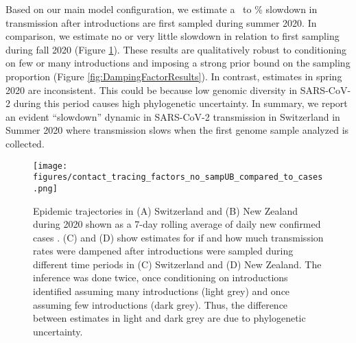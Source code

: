 \documentclass[11pt,twoside,lineno]{pnas-new} %
\begin{document}
Based on our main model configuration, we estimate a \summermaxdampingpercentmedianCHEnosampUB\ to \summermindampingpercentmedianCHEnosampUB\% slowdown in transmission after introductions are first sampled during summer 2020. In comparison, we estimate no or very little slowdown in relation to first sampling during fall 2020 (Figure \ref{fig:scale-factor}). These results are qualitatively robust to conditioning on few or many introductions and imposing a strong prior bound on the sampling proportion (Figure \ref{fig:DampingFactorResults}). In contrast, estimates in spring 2020 are inconsistent. This could be because low genomic diversity in SARS-CoV-2 during this period causes high phylogenetic uncertainty. In summary, we report an evident ``slowdown'' dynamic in SARS-CoV-2 transmission in Switzerland in Summer 2020 where transmission slows when the first genome sample analyzed is collected.

\begin{figure}[h!]
\centering
\texttt{[image: figures/contact\_tracing\_factors\_no\_sampUB\_compared\_to\_cases.png]}
\caption{Epidemic trajectories in (A) Switzerland and (B) New Zealand during 2020 shown as a 7-day rolling average of daily new confirmed cases \cite{Appel}. (C) and (D) show estimates for if and how much transmission rates were dampened after introductions were sampled during different time periods in (C) Switzerland and (D) New Zealand. The inference was done twice, once conditioning on introductions identified assuming many introductions (light grey) and once assuming few introductions (dark grey). Thus, the difference between estimates in light and dark grey are due to phylogenetic uncertainty.}  
\label{fig:scale-factor}
\end{figure}
\end{document}
